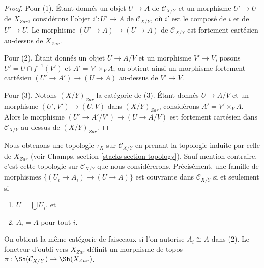 \begin{proof}
Pour (1). Étant donnés un objet $U \to A$ de $\mathcal{C}_{X/Y}$ et un
morphisme $U' \to U$ de $X_{Zar}$, considérons l'objet $i' : U' \to A$ de
$\mathcal{C}_{X/Y}$, où $i'$ est le composé de $i$ et de $U' \to U$.
Le morphisme $(U' \to A) \to (U \to A)$ de $\mathcal{C}_{X/Y}$
est fortement cartésien au-dessus de $X_{Zar}$.

\medskip\noindent
Pour (2). Étant donnés un objet $U \to A/V$ et un morphisme $V' \to V$,
posons $U' = U \cap f^{-1}(V')$ et $A' = V' \times_V A$; on obtient ainsi
un morphisme fortement cartésien $(U' \to A') \to (U \to A)$ au-dessus de
$V' \to V$.

\medskip\noindent
Pour (3). Notons $(X/Y)_{Zar}$ la catégorie de (3). Étant donnés
$U \to A/V$ et un morphisme $(U', V') \to (U, V)$ dans $(X/Y)_{Zar}$,
considérons $A' = V' \times_V A$. Alors le morphisme
$(U' \to A'/V') \to (U \to A/V)$ est fortement cartésien dans
$\mathcal{C}_{X/Y}$ au-dessus de $(X/Y)_{Zar}$.
\end{proof}

\noindent
Nous obtenons une topologie $\tau_X$ sur $\mathcal{C}_{X/Y}$ en
prenant la topologie induite par celle de $X_{Zar}$ (voir
Champs, section \ref{stacks-section-topology}). Sauf mention contraire,
c'est cette topologie sur $\mathcal{C}_{X/Y}$ que nous considérerons.
Précisément, une famille de morphismes
$\{(U_i \to A_i) \to (U \to A)\}$ est couvrante dans
$\mathcal{C}_{X/Y}$ si et seulement si
\begin{enumerate}
\item $U = \bigcup U_i$, et
\item $A_i = A$ pour tout $i$.
\end{enumerate}
On obtient la même catégorie de faisceaux si l'on autorise
$A_i \cong A$ dans (2). Le foncteur d'oubli vers $X_{Zar}$ définit un
morphisme de topos
$\pi : \Sh(\mathcal{C}_{X/Y}) \to \Sh(X_{Zar})$.

